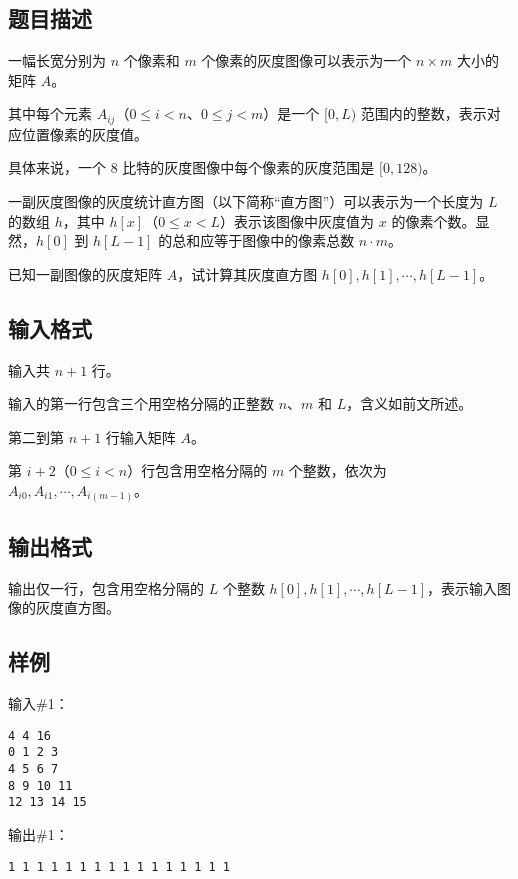 \subsection*{题目描述}

一幅长宽分别为 $n$ 个像素和 $m$ 个像素的灰度图像可以表示为一个 $n \times m$ 大小的矩阵 $A$。

其中每个元素 $A_{ij}$（$0 \le i <n$、$0 \le j < m$）是一个 $[0, L)$ 范围内的整数，表示对应位置像素的灰度值。

具体来说，一个 $8$ 比特的灰度图像中每个像素的灰度范围是 $[0, 128)$。

一副灰度图像的灰度统计直方图（以下简称“直方图”）可以表示为一个长度为 $L$ 的数组 $h$，其中 $h[x]$（$0 \le x < L$）表示该图像中灰度值为 $x$ 的像素个数。显然，$h[0]$ 到 $h[L-1]$ 的总和应等于图像中的像素总数 $n \cdot m$。

已知一副图像的灰度矩阵 $A$，试计算其灰度直方图 $h[0], h[1], \cdots, h[L-1]$。


\subsection*{输入格式}

输入共 $n + 1$ 行。

输入的第一行包含三个用空格分隔的正整数 $n$、$m$ 和 $L$，含义如前文所述。

第二到第 $n + 1$ 行输入矩阵 $A$。

第 $i + 2$（$0 \le i < n$）行包含用空格分隔的 $m$ 个整数，依次为 $A_{i0}, A_{i1}, \cdots, A_{i(m-1)}$。


\subsection*{输出格式}

输出仅一行，包含用空格分隔的 $L$ 个整数 $h[0], h[1], \cdots, h[L-1]$，表示输入图像的灰度直方图。


\subsection*{样例}

输入\#1：

\begin{lstlisting}
4 4 16
0 1 2 3
4 5 6 7
8 9 10 11
12 13 14 15
\end{lstlisting}

输出\#1：

\begin{lstlisting}
1 1 1 1 1 1 1 1 1 1 1 1 1 1 1 1
\end{lstlisting}

